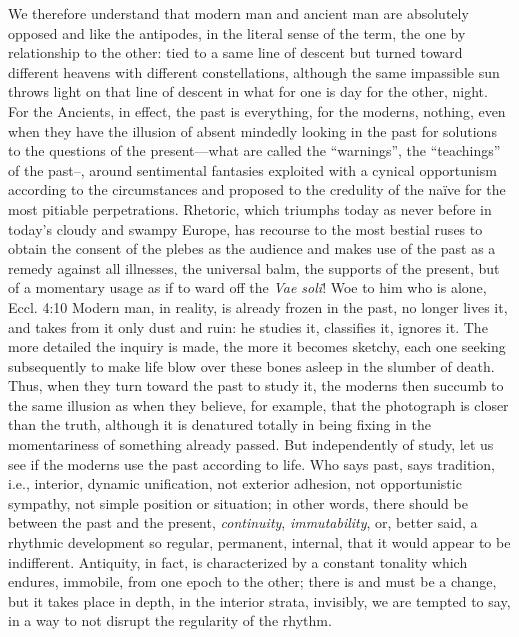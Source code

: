 We therefore understand that modern man and ancient man are absolutely opposed and like the antipodes, in the literal sense of the term, the one by relationship to the other: tied to a same line of descent but turned toward different heavens with different constellations, although the same impassible sun throws light on that line of descent in what for one is day for the other, night. For the Ancients, in effect, the past is everything, for the moderns, nothing, even when they have the illusion of absent mindedly looking in the past for solutions to the questions of the present---what are called the ``warnings'', the ``teachings'' of the past--, around sentimental fantasies exploited with a cynical opportunism according to the circumstances and proposed to the credulity of the naïve for the most pitiable perpetrations. Rhetoric, which triumphs today as never before in today's cloudy and swampy Europe, has recourse to the most bestial ruses to obtain the consent of the plebes as the audience and makes use of the past as a remedy against all illnesses, the universal balm, the supports of the present, but of a momentary usage as if to ward off the \emph{Vae soli}! Woe to him who is alone, Eccl. 4:10 Modern man, in reality, is already frozen in the past, no longer lives it, and takes from it only dust and ruin: he studies it, classifies it, ignores it. The more detailed the inquiry is made, the more it becomes sketchy, each one seeking subsequently to make life blow over these bones asleep in the slumber of death. Thus, when they turn toward the past to study it, the moderns then succumb to the same illusion as when they believe, for example, that the photograph is closer than the truth, although it is denatured totally in being fixing in the momentariness of something already passed. But independently of study, let us see if the moderns use the past according to life. Who says past, says tradition, i.e., interior, dynamic unification, not exterior adhesion, not opportunistic sympathy, not simple position or situation; in other words, there should be between the past and the present, \emph{continuity}, \emph{immutability}, or, better said, a rhythmic development so regular, permanent, internal, that it would appear to be indifferent. Antiquity, in fact, is characterized by a constant tonality which endures, immobile, from one epoch to the other; there is and must be a change, but it takes place in depth, in the interior strata, invisibly, we are tempted to say, in a way to not disrupt the regularity of the rhythm.



